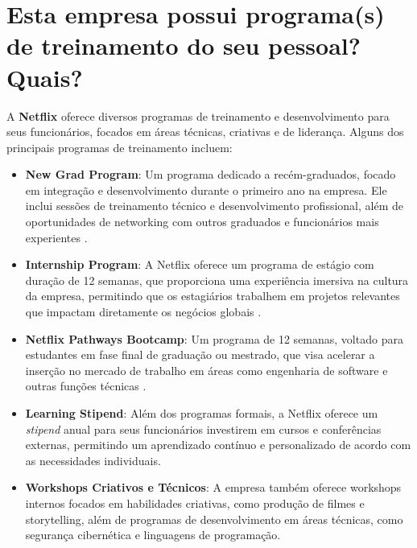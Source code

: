 \section{Esta empresa possui programa(s) de treinamento do seu pessoal? Quais?}

A \textbf{Netflix} oferece diversos programas de treinamento e desenvolvimento para seus funcionários, focados em áreas técnicas, criativas e de liderança. Alguns dos principais programas de treinamento incluem:

\begin{itemize}
    \item \textbf{New Grad Program}: Um programa dedicado a recém-graduados, focado em integração e desenvolvimento durante o primeiro ano na empresa. Ele inclui sessões de treinamento técnico e desenvolvimento profissional, além de oportunidades de networking com outros graduados e funcionários mais experientes \cite{netflix_new_grad}.
    
    \item \textbf{Internship Program}: A Netflix oferece um programa de estágio com duração de 12 semanas, que proporciona uma experiência imersiva na cultura da empresa, permitindo que os estagiários trabalhem em projetos relevantes que impactam diretamente os negócios globais \cite{netflix_intern_program}.
    
    \item \textbf{Netflix Pathways Bootcamp}: Um programa de 12 semanas, voltado para estudantes em fase final de graduação ou mestrado, que visa acelerar a inserção no mercado de trabalho em áreas como engenharia de software e outras funções técnicas \cite{netflix_bootcamp}.

    \item \textbf{Learning Stipend}: Além dos programas formais, a Netflix oferece um \textit{stipend} anual para seus funcionários investirem em cursos e conferências externas, permitindo um aprendizado contínuo e personalizado de acordo com as necessidades individuais.
    
    \item \textbf{Workshops Criativos e Técnicos}: A empresa também oferece workshops internos focados em habilidades criativas, como produção de filmes e storytelling, além de programas de desenvolvimento em áreas técnicas, como segurança cibernética e linguagens de programação.
\end{itemize}


